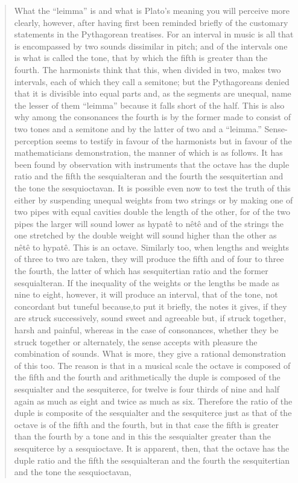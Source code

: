 \documentclass{amsart}
\theoremstyle{definition}
\begin{document}
\begin{quote}
What the ``leimma'' is and what is Plato's meaning you will perceive more clearly, however, after having first been reminded briefly of the customary statements in the Pythagorean treatises. For an interval in music is all that is encompassed by two sounds dissimilar in pitch; and of the intervals one is what is called the tone, that by which the fifth is greater than
 the fourth. The harmonists think that this, when divided in two, makes two intervals, each of which they call a semitone; but the Pythagoreans denied that it is divisible into equal
 parts and, as the segments are unequal, name the lesser of them ``leimma'' because it falls short of the half. This is also why among the consonances the fourth is by the former 
 made to consist of two tones and a semitone and by the latter of two and a ``leimma.'' Sense-perception seems to testify in favour of the harmonists but in favour of the
 mathematicians demonstration, the manner of which is
 as follows. It has been found by observation with instruments that the octave has the duple ratio and the fifth the sesquialteran and the fourth the sesquitertian and the tone
 the sesquioctavan. It is possible even now to test the truth of this either by suspending unequal weights from two strings or by making one of two pipes with equal cavities double
 the length of the other, for of the two pipes the larger will sound lower as hypat\^e to n\^et\^e and of the strings the one stretched by the double weight will 
 sound higher than the other as n\^et\^e to hypat\^e. This is an octave. Similarly too, when lengths and weights of three to two are taken, they will produce the fifth and of four to three
 the fourth, the latter of which has sesquitertian ratio and the former sesquialteran. If the inequality of the weights or the
 lengths be made as nine to eight, however, it will produce an interval, that of the tone, not concordant but tuneful because,to put it briefly, the notes it gives, if they are struck 
 successively, sound sweet and agreeable but, if struck together, harsh and painful, whereas in the case of consonances, whether they be struck together or alternately, the sense
  accepts with pleasure the combination of sounds. What is more, they give a rational demonstration of this too. The reason is that in a musical scale the octave is composed of the 
  fifth and the fourth and arithmetically the duple is composed of the sesquialter and the sesquiterce, for twelve is four thirds of nine and half again as much as eight and twice as
   much as six. Therefore the ratio of the duple is composite of the sesquialter and the sesquiterce just as that of the octave is of the fifth and the fourth, but in that case the fifth is 
   greater than the fourth by a tone and in this the sesquialter greater than the sesquiterce by a sesquioctave. It is apparent, then, that the octave
has the duple ratio and the fifth the sesquialteran and the fourth the sesquitertian and the tone the sesquioctavan,
\end{quote}
\end{document}

